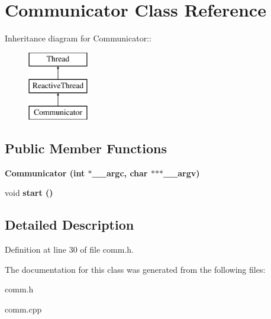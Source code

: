 \section{Communicator Class Reference}
\label{class_communicator}
Inheritance diagram for Communicator::\begin{figure}[H]
\begin{center}
\leavevmode
\includegraphics[height=3cm]{class_communicator}
\end{center}
\end{figure}
\subsection*{Public Member Functions}
\begin{CompactItemize}
\item 
\bf{Communicator} (int $\ast$\_\-\_\-argc, char $\ast$$\ast$$\ast$\_\-\_\-argv)\label{class_communicator_7c9dce4ea92bd04d01d53f80c0ef08ee}

\item 
void \bf{start} ()\label{class_communicator_142fae13b16b166519315f248a513c62}

\end{CompactItemize}


\subsection{Detailed Description}




Definition at line 30 of file comm.h.

The documentation for this class was generated from the following files:\begin{CompactItemize}
\item 
comm.h\item 
comm.cpp\end{CompactItemize}
